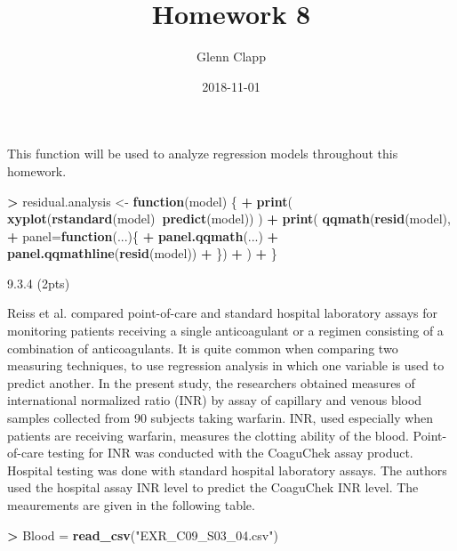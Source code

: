 \documentclass[]{article}
\title{Homework 8}
\author{Glenn Clapp}
\date{2018-11-01}
\newenvironment{Shaded}{\begin{snugshade}}{\end{snugshade}}
\newcommand{\KeywordTok}[1]{\textcolor[rgb]{0.13,0.29,0.53}{\textbf{#1}}}
\newcommand{\DataTypeTok}[1]{\textcolor[rgb]{0.13,0.29,0.53}{#1}}
\newcommand{\StringTok}[1]{\textcolor[rgb]{0.31,0.60,0.02}{#1}}
\newcommand{\ControlFlowTok}[1]{\textcolor[rgb]{0.13,0.29,0.53}{\textbf{#1}}}
\newcommand{\OperatorTok}[1]{\textcolor[rgb]{0.81,0.36,0.00}{\textbf{#1}}}
\newcommand{\NormalTok}[1]{#1}
\begin{document}
\maketitle

This function will be used to analyze regression models throughout this
homework.

\begin{Shaded}
\begin{Highlighting}[]
\OperatorTok{>}\StringTok{ }\NormalTok{residual.analysis <-}\StringTok{ }\ControlFlowTok{function}\NormalTok{(model) \{}
\OperatorTok{+}\StringTok{   }\KeywordTok{print}\NormalTok{( }\KeywordTok{xyplot}\NormalTok{(}\KeywordTok{rstandard}\NormalTok{(model)}\OperatorTok{~}\KeywordTok{predict}\NormalTok{(model)) )}
\OperatorTok{+}\StringTok{   }\KeywordTok{print}\NormalTok{( }\KeywordTok{qqmath}\NormalTok{(}\KeywordTok{resid}\NormalTok{(model),}
\OperatorTok{+}\StringTok{                 }\DataTypeTok{panel=}\ControlFlowTok{function}\NormalTok{(...)\{}
\OperatorTok{+}\StringTok{                   }\KeywordTok{panel.qqmath}\NormalTok{(...)}
\OperatorTok{+}\StringTok{                   }\KeywordTok{panel.qqmathline}\NormalTok{(}\KeywordTok{resid}\NormalTok{(model))}
\OperatorTok{+}\StringTok{                 }\NormalTok{\})}
\OperatorTok{+}\StringTok{   }\NormalTok{)}
\OperatorTok{+}\StringTok{ }\NormalTok{\}}
\end{Highlighting}
\end{Shaded}

9.3.4 (2pts)

Reiss et al. compared point-of-care and standard hospital laboratory
assays for monitoring patients receiving a single anticoagulant or a
regimen consisting of a combination of anticoagulants. It is quite
common when comparing two measuring techniques, to use regression
analysis in which one variable is used to predict another. In the
present study, the researchers obtained measures of international
normalized ratio (INR) by assay of capillary and venous blood samples
collected from 90 subjects taking warfarin. INR, used especially when
patients are receiving warfarin, measures the clotting ability of the
blood. Point-of-care testing for INR was conducted with the CoaguChek
assay product. Hospital testing was done with standard hospital
laboratory assays. The authors used the hospital assay INR level to
predict the CoaguChek INR level. The meaurements are given in the
following table.

\begin{Shaded}
\begin{Highlighting}[]
\OperatorTok{>}\StringTok{ }\NormalTok{Blood =}\StringTok{ }\KeywordTok{read_csv}\NormalTok{(}\StringTok{"EXR_C09_S03_04.csv"}\NormalTok{)}
\end{Highlighting}
\end{Shaded}
\end{document}
